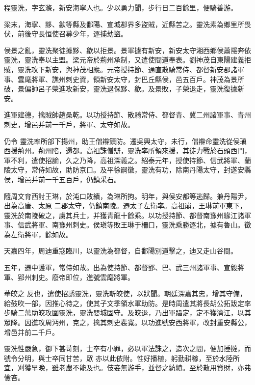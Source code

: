 \begin{pinyinscope}
 程靈洗，字玄滌，新安海寧人也。少以勇力聞，步行日二百餘里，便騎善游。



 梁末，海寧、黟、歙等縣及鄱陽、宣城郡界多盜賊，近縣苦之。靈洗素為鄉里所畏伏，前後守長恒使召募少年，逐捕劫盜。



 侯景之亂，靈洗聚徒據黟、歙以拒景。景軍據有新安，新安太守湘西鄉侯蕭隱奔依
 靈洗，靈洗奉以主盟。梁元帝於荊州承制，又遣使間道奉表。劉神茂自東陽建義拒賊，靈洗攻下新安，與神茂相應。元帝授持節、通直散騎常侍、都督新安郡諸軍事、雲麾將軍、譙州刺史資，領新安太守，封巴丘縣侯，邑五百戶。神茂為景所破，景偏帥呂子榮進攻新安，靈洗退保黟、歙。及景敗，子榮退走，靈洗復據新安。



 進軍建德，擒賊帥趙桑乾。以功授持節、散騎常侍、都督青、冀二州諸軍事、青州刺史，增邑并前一千戶，將軍、太守如故。



 仍令
 靈洗率所部下揚州，助王僧辯鎮防。遷吳興太守，未行，僧辯命靈洗從侯瑱西援荊州。荊州陷，還都。高祖誅僧辯，靈洗率所領來援，其徒力戰於石頭西門，軍不利，遣使招諭，久之乃降，高祖深義之。紹泰元年，授使持節、信武將軍、蘭陵太守，常侍如故，助防京口。及平徐嗣徽，靈洗有功，除南丹陽太守，封遂安縣侯，增邑并前一千五百戶，仍鎮采石。



 隨周文育西討王琳，於沌口敗績，為琳所拘。明年，與侯安都等逃歸。兼丹陽尹，出為高唐、太原
 二郡太守，仍鎮南陵。遷太子左衛率。高祖崩，王琳前軍東下，靈洗於南陵破之，虜其兵士，并獲青龍十餘乘。以功授持節、都督南豫州緣江諸軍事、信武將軍、南豫州刺史。侯瑱等敗王琳于柵口，靈洗乘勝逐北，據有魯山。徵為左衛將軍，餘如故。



 天嘉四年，周迪重寇臨川，以靈洗為都督，自鄱陽別道擊之，迪又走山谷間。



 五年，遷中護軍，常侍如故。出為使持節、都督郢、巴、武三州諸軍事、宣毅將軍、郢州刺史。廢帝即位，進號雲麾將軍。



 華皎之
 反也，遣使招誘靈洗，靈洗斬皎使，以狀聞。朝廷深嘉其忠，增其守備，給鼓吹一部，因推心待之，使其子文季領水軍助防。是時周遣其將長胡公拓跋定率步騎二萬助皎攻圍靈洗，靈洗嬰城固守。及皎退，乃出軍躡定，定不獲濟江，以其眾降。因進攻周沔州，克之，擒其刺史裴寬。以功進號安西將軍，改封重安縣公，增邑并前二千戶。



 靈洗性嚴急，御下甚苛刻，士卒有小罪，必以軍法誅之，造次之間，便加捶撻，而號令分明，與士卒同甘苦，眾
 亦以此依附。性好播植，躬勤耕稼，至於水陸所宜，刈獲早晚，雖老農不能及也。伎妾無游手，並督之紡績。至於散用貲財，亦弗儉吝。




\end{pinyinscope}
